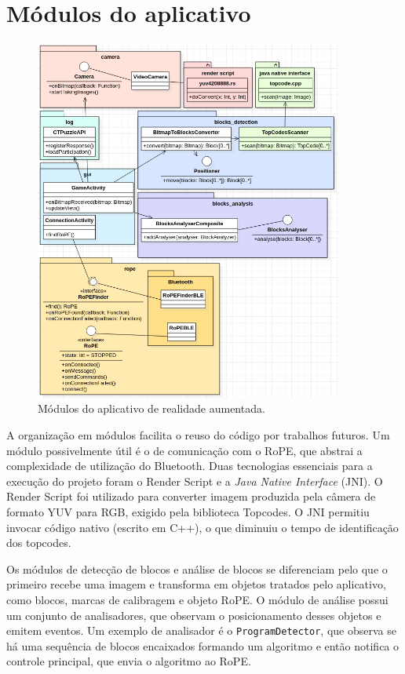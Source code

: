 \chapter{Módulos do aplicativo}
\label{apendice_c}
\begin{figure}[!h]
\includegraphics[width=0.9\textwidth,fbox]{figs/app_modules.png}
\caption{Módulos do aplicativo de realidade aumentada.}
\end{figure}

A organização em módulos facilita o reuso do código por trabalhos futuros. Um módulo possivelmente útil é o de comunicação com o RoPE, que abstrai a complexidade de utilização do Bluetooth. Duas tecnologias essenciais para a execução do projeto foram o Render Script e a \textit{Java Native Interface} (JNI). O Render Script foi utilizado para converter imagem produzida pela câmera de formato YUV para RGB, exigido pela biblioteca Topcodes. O JNI permitiu invocar código nativo (escrito em C++), o que diminuiu o tempo de identificação dos topcodes.

Os módulos de detecção de blocos e análise de blocos se diferenciam pelo que o primeiro recebe uma imagem e transforma em objetos tratados pelo aplicativo, como blocos, marcas de calibragem e objeto RoPE. O módulo de análise possui um conjunto de analisadores, que observam o posicionamento desses objetos e emitem eventos. Um exemplo de analisador é o \texttt{ProgramDetector}, que observa se há uma sequência de blocos encaixados formando um algoritmo e então notifica o controle principal, que envia o algoritmo ao RoPE.
